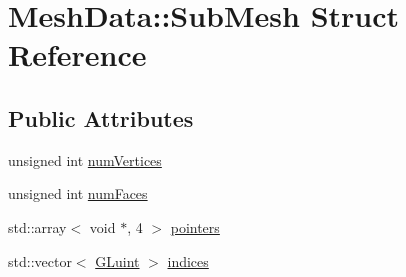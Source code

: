 \hypertarget{structMeshData_1_1SubMesh}{\section{Mesh\-Data\-:\-:Sub\-Mesh Struct Reference}
\label{structMeshData_1_1SubMesh}
}
\subsection*{Public Attributes}
\begin{DoxyCompactItemize}
\item 
unsigned int \hyperlink{structMeshData_1_1SubMesh_af8d61f18a35765e1103e5f68f1ad2dfa}{num\-Vertices}
\item 
unsigned int \hyperlink{structMeshData_1_1SubMesh_a7eb344d66f099df939c1f9b22a24470d}{num\-Faces}
\item 
std\-::array$<$ void $\ast$, 4 $>$ \hyperlink{structMeshData_1_1SubMesh_a82f8f81b976a144692e020e09598da3d}{pointers}
\item 
std\-::vector$<$ \hyperlink{Shader_8hpp_aa311c7f0d6ec4f1a33f9235c3651b86b}{G\-Luint} $>$ \hyperlink{structMeshData_1_1SubMesh_a3ddfe66733b41299f885428c38ab5bca}{indices}
\end{DoxyCompactItemize}


